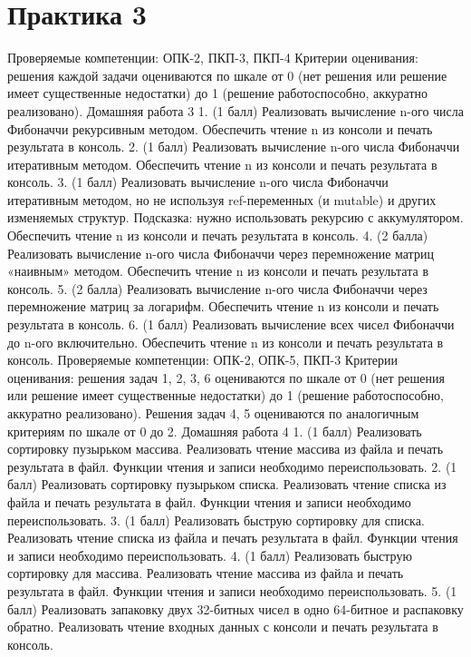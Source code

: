 \section{Практика 3}

Проверяемые компетенции: ОПК-2, ПКП-3, ПКП-4
Критерии оценивания: решения каждой задачи оцениваются по шкале от 0 (нет решения или решение имеет существенные недостатки) до 1 (решение работоспособно, аккуратно реализовано).
Домашняя работа 3
    1. (1 балл) Реализовать вычисление n-ого числа Фибоначчи рекурсивным методом. Обеспечить чтение n из консоли и печать результата в консоль.
    2. (1 балл) Реализовать вычисление n-ого числа Фибоначчи итеративным методом. Обеспечить чтение n из консоли и печать результата в консоль.
    3. (1 балл) Реализовать вычисление n-ого числа Фибоначчи итеративным методом, но не используя ref-переменных (и mutable) и других изменяемых структур. Подсказка: нужно использовать рекурсию с аккумулятором. Обеспечить чтение n из консоли и печать результата в консоль.
    4. (2 балла) Реализовать вычисление n-ого числа Фибоначчи через перемножение матриц «наивным» методом. Обеспечить чтение n из консоли и печать результата в консоль.
    5. (2 балла) Реализовать вычисление n-ого числа Фибоначчи через перемножение матриц за логарифм. Обеспечить чтение n из консоли и печать результата в консоль.
    6. (1 балл) Реализовать вычисление всех чисел Фибоначчи до n-ого включительно. Обеспечить чтение n из консоли и печать результата в консоль.
Проверяемые компетенции: ОПК-2, ОПК-5, ПКП-3
Критерии оценивания: решения задач 1, 2, 3, 6 оцениваются по шкале от 0 (нет решения или решение имеет существенные недостатки) до 1 (решение работоспособно, аккуратно реализовано). Решения задач 4, 5 оцениваются по аналогичным критериям по шкале от 0 до 2.
Домашняя работа 4
    1. (1 балл) Реализовать сортировку пузырьком массива. Реализовать чтение массива из файла и печать результата в файл. Функции чтения и записи необходимо переиспользовать.
    2. (1 балл) Реализовать сортировку пузырьком списка. Реализовать чтение списка из файла и печать результата в файл. Функции чтения и записи необходимо переиспользовать.
    3. (1 балл) Реализовать быструю сортировку для списка. Реализовать чтение списка из файла и печать результата в файл. Функции чтения и записи необходимо переиспользовать.
    4. (1 балл) Реализовать быструю сортировку для массива. Реализовать чтение массива из файла и печать результата в файл. Функции чтения и записи необходимо переиспользовать.
    5. (1 балл) Реализовать запаковку двух 32-битных чисел в одно 64-битное и распаковку обратно. Реализовать чтение входных данных с консоли и печать результата в консоль.
